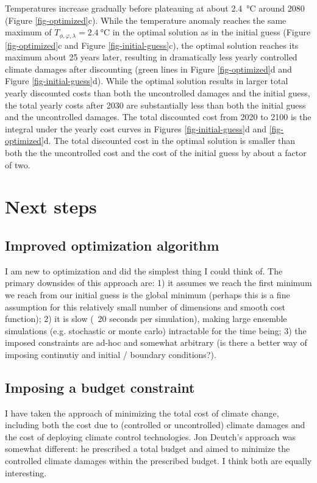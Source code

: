 \documentclass{article}
\begin{document}
Temperatures increase gradually before plateauing at about \SI{2.4}{\celsius} around 2080 (Figure \ref{fig-optimized}c). While the temperature anomaly reaches the same maximum of $T_{\phi, \varphi, \lambda} = \SI{2.4}{\celsius}$ in the optimal solution as in the initial guess (Figure \ref{fig-optimized}c and Figure \ref{fig-initial-guess}c), the optimal solution reaches its maximum about 25 years later, resulting in dramatically less yearly controlled climate damages after discounting (green lines in Figure \ref{fig-optimized}d and Figure \ref{fig-initial-guess}d). While the optimal solution results in larger total yearly discounted costs than both the uncontrolled damages and the initial guess, the total yearly costs after 2030 are substantially less than both the initial guess and the uncontrolled damages. The total discounted cost from 2020 to 2100 is the integral under the yearly cost curves in Figures \ref{fig-initial-guess}d and \ref{fig-optimized}d. The total discounted cost in the optimal solution is smaller than both the the uncontrolled cost and the cost of the initial guess by about a factor of two.

\section{Next steps}

\subsection{Improved optimization algorithm}

I am new to optimization and did the simplest thing I could think of. The primary downsides of this approach are: 1) it assumes we reach the first minimum we reach from our initial guess is the global minimum (perhaps this is a fine assumption for this relatively small number of dimensions and smooth cost function); 2) it is slow (~20 seconds per simulation), making large ensemble simulations (e.g. stochastic or monte carlo) intractable for the time being; 3) the imposed constraints are ad-hoc and somewhat arbitrary (is there a better way of imposing continutiy and initial / boundary conditions?).

\subsection{Imposing a budget constraint}

I have taken the approach of minimizing the total cost of climate change, including both the cost due to (controlled or uncontrolled) climate damages and the cost of deploying climate control technologies. Jon Deutch's approach was somewhat different: he prescribed a total budget and aimed to minimize the controlled climate damages within the prescribed budget. I think both are equally interesting.
\end{document}

